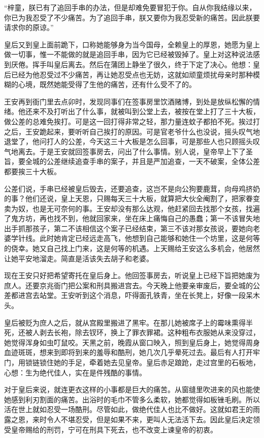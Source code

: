 “梓童，朕已有了追回手串的办法，但是却难免要冒犯于你。自从你我结缘以来，你已为我忍受了不少痛苦。为了追回手串，朕又要你为我忍受新的痛苦。因此朕要请求你的原谅。” 

皇后又到皇上面前跪下，口称她能够身为当今国母，全赖皇上的厚恩，她愿为皇上做一切事，惟一不能做的就是追回手串，因为它已经被毁掉了。皇上对这种说法感到厌倦。挥手叫皇后离去。然后在蒲团上静坐了很久，终于下定了决心。他想：皇后已经为他忍受过不少痛苦，再让她忍受点也无妨，这就如顽童烦扰母亲时那种模糊的心境，既然她能受得了生他的痛苦，还有什么受不了的。 

王安再到衙门里去点卯时，发现同事们在签事房里饮酒赌博，到处是放纵松懈的情绪。他还来不及打听出了什么事，就被叫到公堂上去，被按在堂上打了三十大板，做公差的总难免挨打。可是这一回打得非常之轻，那力量连蚊子都拍不死。挨过打之后，王安跪起来，要听听自己挨打的原因。可是官老爷什么也没说，摇头叹气地退堂了，他问打人的公差，今天这三十大板是怎么回事，可是那些人也只顾摇头叹气地离去。于是王安就回签事房去，问出了什么事情。别人说，皇帝早上下了圣旨，要全城的公差继续追查手串的案子，并且是严加追查，一天不破案，全体公差都要挨三十大板。 

公差们说，手串已经被皇后毁去，还要追查，这岂不是向公狗要鹿茸，向母鸡挤奶的事？他们还说，皇上天恩，只赐每天三十大板，就算把大伙全阉割了，把家眷变卖为奴，也是无可奈何的事。王安却没有那么达观，他赶紧回去找那个女孩，找遍了鬼方坊，再也找不到，他就回家来，坐在床上痛悔自己的愚蠢；第一不该冒失地出手抓那孩子，第二不该相信这个案子已经结束，第三不该对那女孩说，要她向老婆学针线。此时她肯定已经远走高飞，他想到自己能够和她住一个坊里，这是何等的侥幸。她又自己找上门来，这是何等的机遇。上天赐给王安这么多机会，他居然让她平安地溜走。简直是活该失去胡子和老婆。 

现在王安只好把希望寄托在皇后身上。他回签事房去，听说皇上已经下旨把她废为庶人。还要京兆衙门把公案和刑具搬进宫去。今天晚上他要亲审废后，要全城的公差都进宫去站堂。王安听到这个消息，吓得面孔铁青，坐在长凳上，好像一段呆木头。 

皇后被贬为庶人之后，就从宫殿里搬进了黑牢。在那儿她被席子上的霉味熏得半死，还被人剥去长袍，除去钗环，换上了罪衣罪裙。这种粗布衣服她从来没穿过，她觉得浑身如虫叮鼠咬。天黑之前，晚霞从窗口映入，照到皇后身上，她觉得周身血迹斑斑，想来到即将到来的羞辱和酷刑，她几次几乎晕死过去。最后有人打开牢门，用锁链锁住她的手足，牵着她去见皇帝。皇后赤足踉跄，走过宫里的石板地，心想：生为绝代佳人，实在是件残酷的事情。 

对于皇后来说，就连更衣这样的小事都是巨大的痛苦。从窗缝里吹进来的风也能使她感到利刃割面的痛苦。出浴时的毛巾不管多么柔软，她都觉得如板锉毛刷。所以活在世上就如忍受一场酷刑。尽管如此，做绝代佳人也比不做好。这就如君王的雨露之恩，来时令人不堪忍受，但是如果不来，更叫人无法活下去。因此皇后决定领受皇帝赐给的刑罚，宁可在刑具下死去，也不改变上谏皇帝的初衷。 

